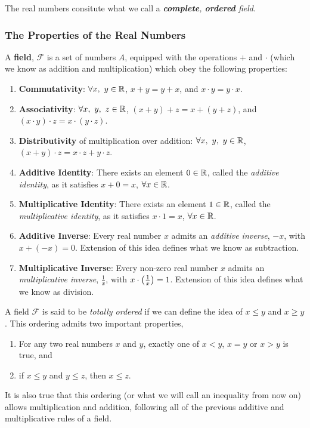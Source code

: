 \documentclass[12pt]{article}
\theoremstyle{definition}
\begin{document}
    \begin{remark}
        The real numbers consitute what we call a \textit{\textbf{complete}, \textbf{ordered} field}.
    \end{remark}

   \subsubsection{The Properties of the Real Numbers}
    A \textbf{field}, $\mathcal{F}$ is a set of numbers $A$, equipped with the operations $+$ and $\cdot$ (which we know as addition and multiplication) which obey the following properties:
    \begin{enumerate}
        \item \textbf{Commutativity}: $\forall x, ~ y \in \R$, $x + y = y + x$, and $x \cdot y = y \cdot x$.
        \item \textbf{Associativity}: $\forall x, ~y, ~z \in \R$, $(x + y) + z = x + (y + z)$, and $(x \cdot y) \cdot z = x \cdot (y \cdot z)$.
        \item \textbf{Distributivity} of multiplication over addition: $\forall x, ~y, ~y \in \R$, $(x + y) \cdot z = x \cdot z + y \cdot z$.
        \item \textbf{Additive Identity}: There exists an element $0 \in \R$, called the \textit{additive identity}, as it satisfies $x + 0 = x$, $\forall x \in \R$.
        \item \textbf{Multiplicative Identity}: There exists an element $1 \in \R$, called the \textit{multiplicative identity}, as it satisfies $x \cdot 1 = x$, $\forall x \in \R$.
        \item \textbf{Additive Inverse}: Every real number $x$ admits an \textit{additive inverse}, $-x$, with $x + (-x) = 0$. Extension of this idea defines what we know as subtraction.
        \item \textbf{Multiplicative Inverse}: Every non-zero real number $x$ admits an \textit{multiplicative inverse}, $\frac{1}{x}$, with $x \cdot \left(\frac{1}{x}\right) = 1$. Extension of this idea defines what we know as division.
    \end{enumerate}

    A field $\mathcal{F}$ is said to be \textit{totally ordered} if we can define the idea of $x \leq y$ and $x \geq y$. This ordering admits two important properties,
    \begin{enumerate}
            \item For any two real numbers $x$ and $y$, exactly one of $x < y$, $x = y$ or $x > y$ is true, and
            \item if $x \leq y$ and $y \leq z$, then $x \leq z$.
    \end{enumerate} 
    It is also true that this ordering (or what we will call an inequality from now on) allows multiplication and addition, following all of the previous additive and multiplicative rules of a field. 
\end{document}

